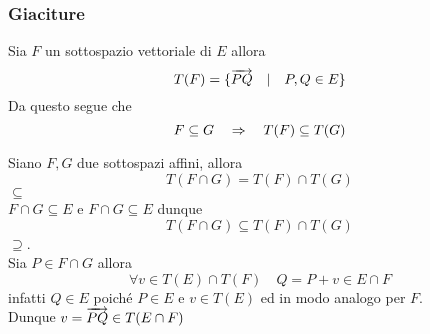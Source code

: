 \newpage
\subsubsection{Giaciture}
Sia $F$ un sottospazio  vettoriale di $E$ allora
$$ T(F)= \{ \overrightarrow{PQ} \quad \vert \quad P, Q \in E \}$$
Da questo segue che  $$F\subseteq G \quad \Rightarrow \quad T(F) \subseteq T(G)$$
\begin{prop}\bianco
Siano $F,G$ due sottospazi affini, allora
$$ T (F\cap G ) = T(F) \cap T(G)$$
\proof $\subseteq$ \\
$F \cap G \subseteq E $ e $F \cap G \subseteq E $ dunque
$$ T (F\cap G ) \subseteq T(F) \cap T(G)$$
$\supseteq$.\\
Sia $P\in F \cap G $ allora
$$ \forall v \in T(E) \cap T(F) \quad Q= P+v \in E\cap F$$
infatti $Q\in E $ poich\'e $P\in E $ e $v\in T(E)$ ed in modo analogo per $F$.\\
Dunque $v=\overrightarrow{PQ} \in T(E \cap F)$
\endproof
\end{prop}


